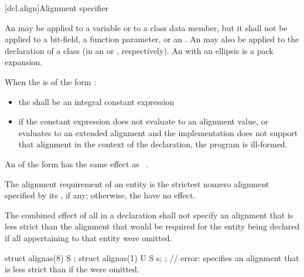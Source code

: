 [dcl.align]{Alignment specifier}%

\pnum
An 
may be applied to a variable
or to a class data member, but it shall not be applied to a bit-field, a function
parameter, or an .
An  may also be applied to the declaration
of a class (in an
 or
, respectively).
An  with an ellipsis is a pack expansion.

\pnum
When the  is of the form
  \tcode{)}:
\begin{itemize}
\item the  shall be an integral constant expression

\item if the constant expression does not evaluate to an alignment
value, or evaluates to an extended alignment and
the implementation does not support that alignment in the context of the
declaration, the program is ill-formed.
\end{itemize}

\pnum
An  of the form
  \tcode{)} has the same
effect as  ~\tcode{))}.

\pnum
The alignment requirement of an entity is the strictest nonzero alignment
specified by its , if any;
otherwise, the  have no effect.

\pnum
The combined effect of all  in a declaration shall not
specify an alignment that is less strict than the alignment that would
be required for the entity being declared if all 
appertaining to that entity
were omitted.
\begin{example}
\begin{codeblock}
struct alignas(8) S {};
struct alignas(1) U {
  S s;
};  // error:  specifies an alignment that is less strict than if the  were omitted.
\end{codeblock}
\end{example}

